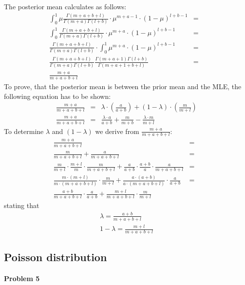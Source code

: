 \documentclass{article}
\begin{document}
The posterior mean calculates as follows:
\begin{eqnarray}
\int_0^1 \mu \frac{\Gamma(m+a+b+l)}{\Gamma(m+a) \Gamma(l+b)} \cdot \mu^{m+a-1} \cdot (1-\mu)^{l+b-1} &=&\\
\int_0^1 \frac{\Gamma(m+a+b+l)}{\Gamma(m+a) \Gamma(l+b)} \cdot \mu^{m+a} \cdot (1-\mu)^{l+b-1} &=&\\
\frac{\Gamma(m+a+b+l)}{\Gamma(m+a) \Gamma(l+b)} \cdot \int_0^1 \mu^{m+a} \cdot (1-\mu)^{l+b-1} &=&\\
\frac{\Gamma(m+a+b+l)}{\Gamma(m+a) \Gamma(l+b)} \frac{\Gamma(m+a+1)\Gamma(l+b)}{\Gamma(m+a+1+b+l)} &=&\\
\frac{m+a}{m+a+b+l}
\end{eqnarray}
To prove, that the posterior mean is between the prior mean and the MLE, the following equation has to be shown:
\begin{eqnarray}
\frac{m+a}{m+a+b+l} &=& \lambda \cdot (\frac{a}{a+b}) + (1-\lambda)\cdot (\frac{m}{m+l})\\
\frac{m+a}{m+a+b+l} &=& \frac{\lambda \cdot a}{a+b} + \frac{m}{m+b} - \frac{\lambda \cdot m}{m+l}
\end{eqnarray}
To determine $\lambda$ and $(1-\lambda)$ we derive from $\frac{m+a}{m+a+b+l}$:
\begin{eqnarray}
\frac{m+a}{m+a+b+l} &=&\\
\frac{m}{m+a+b+l} + \frac{a}{m+a+b+l} &=&\\
\frac{m}{m+l} \cdot \frac{m+l}{m} \cdot \frac{m}{m+a+b+l} + \frac{a}{a+b} \cdot \frac{a+b}{a} \cdot \frac{a}{m+a+b+l} &=&\\
\frac{m\cdot(m+l)}{m\cdot(m+a+b+l)} \cdot \frac{m}{m+l} + \frac{a\cdot(a+b)}{a\cdot(m+a+b+l)}\cdot \frac{a}{a+b} &=&\\
\frac{a+b}{m+a+b+l}\cdot\frac{a}{a+b} + \frac{m+l}{m+a+b+l}\cdot\frac{m}{m+l}
\end{eqnarray}
stating that
\begin{eqnarray}
\lambda = \frac{a+b}{m+a+b+l}\\
1-\lambda = \frac{m+l}{m+a+b+l}
\end{eqnarray}

\subsection{Poisson distribution}
\paragraph*{Problem 5}
$\;$ 
\end{document}
